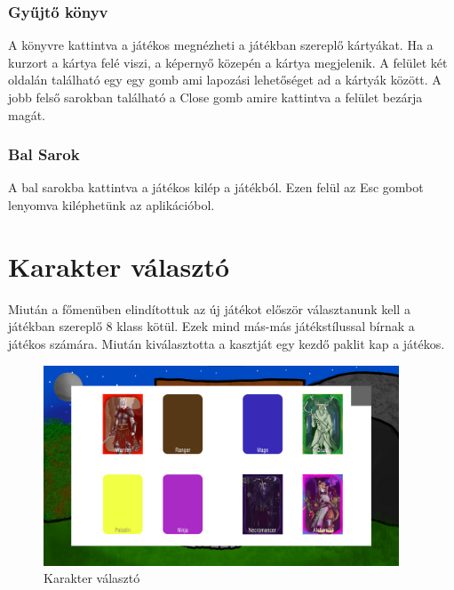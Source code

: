 \subsubsection{Gyűjtő könyv}
A könyvre kattintva a játékos megnézheti a játékban szereplő kártyákat. Ha a kurzort a kártya felé viszi, a képernyő közepén a kártya megjelenik. A felület két oldalán található egy egy gomb ami lapozási lehetőséget ad a kártyák között. A jobb felső sarokban található a Close gomb amire kattintva a felület bezárja magát.
\subsubsection{Bal Sarok}
A bal sarokba kattintva a játékos kilép a játékból. Ezen felül az Esc gombot lenyomva kiléphetünk az aplikációbol.

\section{Karakter választó}

Miután a főmenüben elindítottuk az új játékot először választanunk kell a játékban
szereplő 8 klass kötül. Ezek mind más-más játékstílussal bírnak a játékos számára.
Miután kiválasztotta a kasztját egy kezdő paklit kap a játékos.
\begin{figure}[h]
        \centering
        \includegraphics[width=400px,keepaspectratio]{images/CharSelect.png}
        \caption {Karakter választó}
        \label{Karakter_selektor}
    \hspace{1em}
\end{figure}
\clearpage

